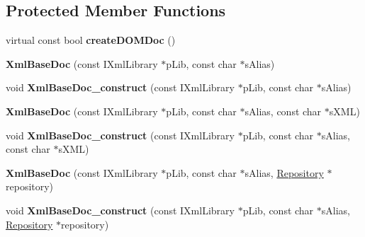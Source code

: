 \subsection*{\-Protected \-Member \-Functions}
\begin{DoxyCompactItemize}
\item 
\hypertarget{classgeneral__server_1_1XmlBaseDoc_a6d8c35317910ce9217a2eed9afccb0ca}{virtual const bool {\bfseries create\-D\-O\-M\-Doc} ()}\label{classgeneral__server_1_1XmlBaseDoc_a6d8c35317910ce9217a2eed9afccb0ca}

\item 
\hypertarget{classgeneral__server_1_1XmlBaseDoc_a0c6826a335e93f9344b9fea87d332a33}{{\bfseries \-Xml\-Base\-Doc} (const \-I\-Xml\-Library $\ast$p\-Lib, const char $\ast$s\-Alias)}\label{classgeneral__server_1_1XmlBaseDoc_a0c6826a335e93f9344b9fea87d332a33}

\item 
\hypertarget{classgeneral__server_1_1XmlBaseDoc_ae1a7aef776b1391a93be19d1dd56fbf6}{void {\bfseries \-Xml\-Base\-Doc\-\_\-construct} (const \-I\-Xml\-Library $\ast$p\-Lib, const char $\ast$s\-Alias)}\label{classgeneral__server_1_1XmlBaseDoc_ae1a7aef776b1391a93be19d1dd56fbf6}

\item 
\hypertarget{classgeneral__server_1_1XmlBaseDoc_aa1c9c30e1c6c46d42e22b458d3867106}{{\bfseries \-Xml\-Base\-Doc} (const \-I\-Xml\-Library $\ast$p\-Lib, const char $\ast$s\-Alias, const char $\ast$s\-X\-M\-L)}\label{classgeneral__server_1_1XmlBaseDoc_aa1c9c30e1c6c46d42e22b458d3867106}

\item 
\hypertarget{classgeneral__server_1_1XmlBaseDoc_ab3de267f899784864272bbc620eb0763}{void {\bfseries \-Xml\-Base\-Doc\-\_\-construct} (const \-I\-Xml\-Library $\ast$p\-Lib, const char $\ast$s\-Alias, const char $\ast$s\-X\-M\-L)}\label{classgeneral__server_1_1XmlBaseDoc_ab3de267f899784864272bbc620eb0763}

\item 
\hypertarget{classgeneral__server_1_1XmlBaseDoc_a9001319105ce88380e680fee6f682661}{{\bfseries \-Xml\-Base\-Doc} (const \-I\-Xml\-Library $\ast$p\-Lib, const char $\ast$s\-Alias, \hyperlink{classgeneral__server_1_1Repository}{\-Repository} $\ast$repository)}\label{classgeneral__server_1_1XmlBaseDoc_a9001319105ce88380e680fee6f682661}

\item 
\hypertarget{classgeneral__server_1_1XmlBaseDoc_af68f8ffbbad2a8a6eba066336e1514e9}{void {\bfseries \-Xml\-Base\-Doc\-\_\-construct} (const \-I\-Xml\-Library $\ast$p\-Lib, const char $\ast$s\-Alias, \hyperlink{classgeneral__server_1_1Repository}{\-Repository} $\ast$repository)}\label{classgeneral__server_1_1XmlBaseDoc_af68f8ffbbad2a8a6eba066336e1514e9}


\end{DoxyCompactItemize}

